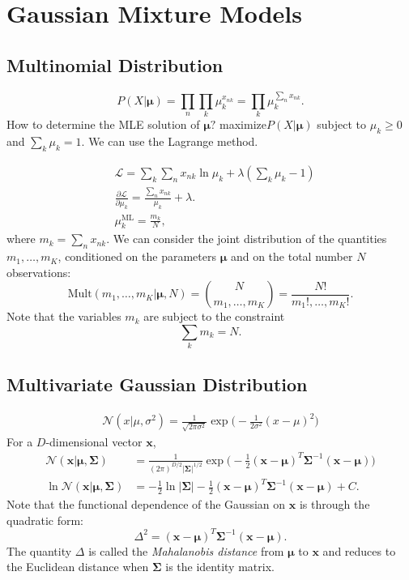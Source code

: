 \section{Gaussian Mixture Models}

\subsection{Multinomial Distribution}
$$P(X|\boldsymbol{\mu}) = \prod_{n} \prod_k \mu_k^{x_{nk}} = \prod_k\mu_k^{\sum_n x_{nk}}.$$
How to determine the MLE solution of $\boldsymbol{\mu}?$ \ie maximize$P(X|\boldsymbol{\mu})$ subject to $\mu_k\geq 0$ and $ \sum_k \mu_k = 1$. We can use the Lagrange method. 

\begin{align*}
	&\mathcal{L} = \sum_k\sum_nx_{nk}\ln \mu_k +\lambda(\sum_k\mu_k-1)\\ 
	&\frac{\partial \mathcal{L}}{\partial \mu_k} = \frac{\sum_nx_{nk}}{\mu_k}+\lambda. \\
	& \mu_k^{\textrm{ML}} = \frac{m_k}{N},
\end{align*}
where $m_k = \sum_n x_{nk}.$ We can consider the joint distribution of the quantities $m_1, \dots, m_K$, conditioned on the parameters $\boldsymbol{\mu}$ and on the total number $N$ observations: 
$$\textrm{Mult}(m_1, \dots, m_K|\boldsymbol{\mu}, N) = \binom{N}{m_1, \dots, m_K} = \frac{N!}{m_1!,\dots, m_K!}.$$
Note that the variables $m_k$ are subject to the constraint
$$\sum_k m_k = N.$$


\subsection{Multivariate Gaussian Distribution}
\begin{align*}
	\mathcal{N}(x|\mu,\sigma^2) = \frac{1}{\sqrt{2\pi\sigma^2}}\exp\bigg(-\frac{1}{2\sigma^2}(x-\mu)^2\bigg)
\end{align*}
For a $D$-dimensional vector $\mathbf{x}$, 
\begin{align*}
	\mathcal{N}(\mathbf{x}|\boldsymbol{\mu},\boldsymbol{\Sigma}) &= \frac{1}{(2\pi)^{D/2}|\boldsymbol{\Sigma}|^{1/2}}\exp\bigg(-\frac{1}{2}(\mathbf{x}-\boldsymbol{\mu})^T\boldsymbol{\Sigma}^{-1}(\mathbf{x}-\boldsymbol{\mu})\bigg)\\
	\ln\mathcal{N}(\mathbf{x}|\boldsymbol{\mu},\boldsymbol{\Sigma}) &= -\frac{1}{2}\ln|\boldsymbol{\Sigma}|-\frac{1}{2}(\mathbf{x}-\boldsymbol{\mu})^T\boldsymbol{\Sigma}^{-1}(\mathbf{x}-\boldsymbol{\mu})+C.
\end{align*}
Note that the functional dependence of the Gaussian on $\mathbf{x}$ is through the quadratic form: 
$$\Delta^2 = (\mathbf{x}-\boldsymbol{\mu})^T\boldsymbol{\Sigma}^{-1}(\mathbf{x}-\boldsymbol{\mu}).$$
The quantity $\Delta$ is called the \textit{Mahalanobis distance} from $\boldsymbol{\mu}$ to $\mathbf{x}$ and reduces to the Euclidean distance when $\boldsymbol{\Sigma}$ is the identity matrix.

